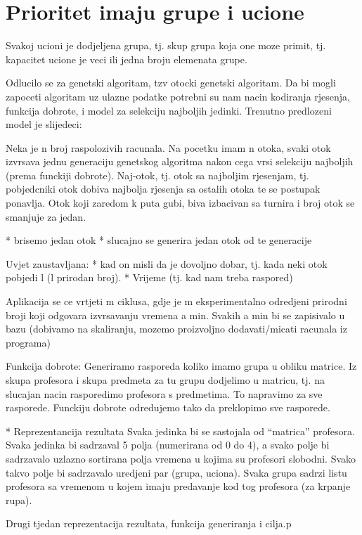     \section{Prioritet imaju grupe i ucione}
    Svakoj ucioni je dodjeljena grupa, tj. skup grupa koja one moze primit, tj. kapacitet ucione je veci ili jedna broju elemenata grupe.


Odlucilo se za genetski algoritam, tzv otocki genetski algoritam. Da bi mogli zapoceti algoritam uz ulazne podatke potrebni su nam nacin kodiranja rjesenja, funkcija dobrote, i model za selekciju najboljih jedinki. Trenutno predlozeni model je slijedeci:

Neka je n broj raspolozivih racunala. Na pocetku imam n otoka, svaki otok izvrsava jednu generaciju genetskog algoritma nakon cega vrsi selekciju najboljih (prema funckiji dobrote). Naj-otok, tj. otok sa najboljim rjesenjam, tj. pobjedcniki otok dobiva najbolja rjesenja sa ostalih otoka te se postupak ponavlja. Otok koji zaredom k puta gubi, biva izbacivan sa turnira i broj otok se smanjuje za jedan.

* brisemo jedan otok
* slucajno se generira jedan otok od te generacije

Uvjet zaustavljana:
* kad on misli da je dovoljno dobar, tj. kada neki otok pobjedi l (l prirodan broj).
* Vrijeme (tj. kad nam treba raspored)

Aplikacija se ce vrtjeti m ciklusa, gdje je m eksperimentalno odredjeni prirodni broji koji odgovara izvrsavanju vremena a min. Svakih a min bi se zapisivalo u bazu (dobivamo na skaliranju, mozemo proizvoljno dodavati/micati racunala iz programa)


Funkcija dobrote: Generiramo rasporeda koliko imamo grupa u obliku matrice. Iz skupa profesora i skupa predmeta za tu grupu dodjelimo u matricu, tj. na slucajan nacin rasporedimo profesora s predmetima. To napravimo za sve rasporede. Funckiju dobrote odredujemo tako da preklopimo sve rasporede.


* Reprezentancija rezultata
Svaka jedinka bi se sastojala od ``matrica'' profesora. Svaka jedinka bi sadrzaval 5 polja (numerirana od 0 do 4), a svako polje bi sadrzavalo uzlazno sortirana polja vremena u kojima su profesori slobodni. Svako takvo polje bi sadrzavalo uredjeni par (grupa, uciona). Svaka grupa sadrzi listu profesora sa vremenom u kojem imaju predavanje kod tog profesora (za krpanje rupa).

Drugi tjedan reprezentacija rezultata, funkcija generiranja i cilja.p
